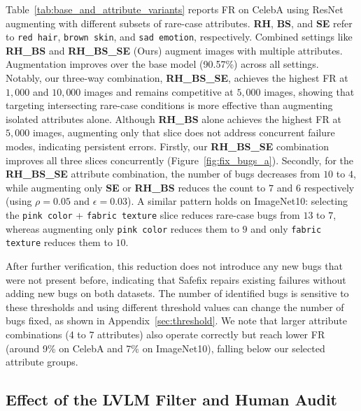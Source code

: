 \documentclass[10pt]{article} %
\begin{document}
Table~\ref{tab:base_and_attribute_variants} reports FR on CelebA using ResNet augmenting with different subsets of rare-case attributes. \textbf{RH}, \textbf{BS}, and \textbf{SE} refer to \texttt{red hair}, \texttt{brown skin}, and \texttt{sad emotion}, respectively. Combined settings like \textbf{RH\_BS} and \textbf{RH\_BS\_SE} (Ours) augment images with multiple attributes. Augmentation improves over the base model (90.57\%) across all settings. Notably, our three-way combination, \textbf{RH\_BS\_SE}, achieves the highest FR at $1,000$ and $10,000$ images and remains competitive at $5,000$ images, showing that targeting intersecting rare-case conditions is more effective than augmenting isolated attributes alone. Although \textbf{RH\_BS} alone achieves the highest FR at $5,000$ images, augmenting only that slice does not address concurrent failure modes, indicating persistent errors. Firstly, our \textbf{RH\_BS\_SE} combination improves all three slices concurrently (Figure~\ref{fig:fix_bugs_a}). Secondly, for the \textbf{RH\_BS\_SE} attribute combination, the number of bugs decreases from $10$ to $4$, while augmenting only \textbf{SE} or \textbf{RH\_BS} reduces the count to $7$ and $6$ respectively (using $\rho=0.05$ and $\epsilon=0.03$). A similar pattern holds on ImageNet10: selecting the \texttt{pink color} + \texttt{fabric texture} slice reduces rare-case bugs from $13$ to $7$, whereas augmenting only \texttt{pink color} reduces them to $9$ and only \texttt{fabric texture} reduces them to $10$.

After further verification, this reduction does not introduce any new bugs that were not present before, indicating that Safefix repairs existing failures without adding new bugs on both datasets. The number of identified bugs is sensitive to these thresholds and using different threshold values can change the number of bugs fixed, as shown in Appendix~\ref{sec:threshold}. We note that larger attribute combinations (4 to 7 attributes) also operate correctly but reach lower FR (around 9\% on CelebA and 7\% on ImageNet10), falling below our selected attribute groups.

\subsection{Effect of the LVLM Filter and Human Audit}
\label{sec:human_audit}


\begin{table}
\vspace{-10pt}
\centering
\setlength{\tabcolsep}{4pt}
\renewcommand{\arraystretch}{1.0}
\small
\caption{\small{Average error rates (\%) before and after LVLM filtering.}}
\label{tab:lvlm_filter}
\vspace{-8pt}
\end{table}
\end{document}
